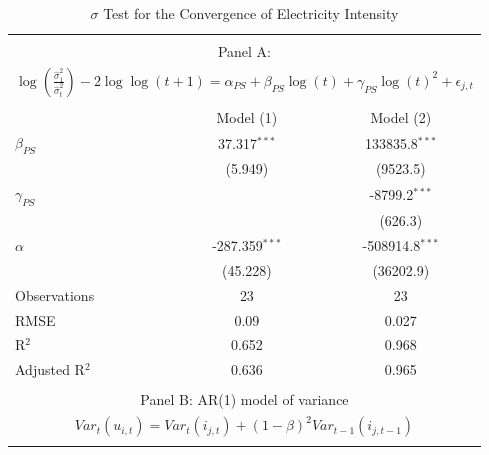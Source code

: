 \documentclass[]{amsart}
\begin{document}
\newpage

	\begin{table}[htb]
		\caption{$\sigma$ Test for the Convergence of Electricity Intensity}
		\label{tbl:Sigma_Results}

		\begin{center}
			\begin{tabular}{lcc}
				\toprule    
				\multicolumn{3}{c}{} \\
				\multicolumn{3}{c}{Panel A: \cite{PhillipsSul2007}} \\
				\multicolumn{3}{c}{$\log{ \left( \frac{\hat \sigma_1^2}{\hat \sigma_t^2} \right)} - 2\log{ \log{(t+1)}} = \alpha_{PS} + \beta_{PS} \log{(t)}+\gamma_{PS} \log{(t)}^2+\epsilon_{j,t}$} \\
				\multicolumn{3}{c}{} \\
				\midrule
				
				& Model (1) & Model (2)  \\ 
				\hline 
				
				$\beta_{PS}$ & \multicolumn{1}{c}{37.317$^{***}$} & \multicolumn{1}{c}{133835.8$^{***}$}   \\ 
				
				& (5.949)& (9523.5)  \\ 
				
				$\gamma_{PS}$ &  & \multicolumn{1}{c}{-8799.2$^{***}$}    \\ 
				
				& & \multicolumn{1}{c}{(626.3)}  \\ 
				
				{$\alpha$} & \multicolumn{1}{c}{-287.359$^{***}$} & \multicolumn{1}{c}{-508914.8$^{***}$}   \\ 
				
				& \multicolumn{1}{c}{(45.228)} & \multicolumn{1}{c}{(36202.9)} \\ 
				
				\hline  
				
				Observations & \multicolumn{1}{c}{23} & \multicolumn{1}{c}{23} \\ 
				
				RMSE & \multicolumn{1}{c}{0.09} & \multicolumn{1}{c}{0.027}  \\ 
				
				R$^{2}$ & \multicolumn{1}{c}{0.652} & \multicolumn{1}{c}{0.968} \\ 
				
				Adjusted R$^{2}$ & \multicolumn{1}{c}{0.636} & \multicolumn{1}{c}{0.965}  \\ 
				\bottomrule
				\toprule    
				\multicolumn{3}{c}{} \\
				\multicolumn{3}{c}{Panel B: AR(1) model of variance} \\
				\multicolumn{3}{c}{$Var_{t}(u_{i,t})= Var_{t}(i_{j,t}) + (1-\beta)^2Var_{t-1}(i_{j,t-1})$} \\
				\multicolumn{3}{c}{} \\
				\midrule
					

\end{tabular}
\end{center}
\end{table}
\end{document}
